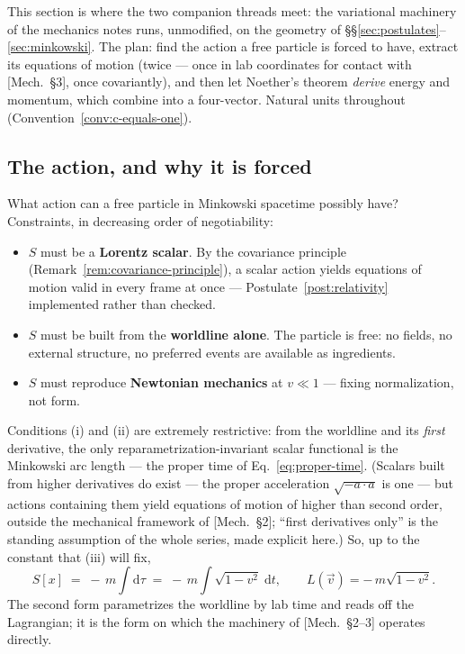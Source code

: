 \documentclass[11pt]{article}
\theoremstyle{plain}
\theoremstyle{definition}
\theoremstyle{remark}
\newcommand{\dd}{\mathrm{d}}
\newcommand{\vv}{\vec{v}}
\begin{document}
This section is where the two companion threads meet: the variational
machinery of the mechanics notes runs, unmodified, on the geometry of
\S\S\ref{sec:postulates}--\ref{sec:minkowski}. The plan: find the
action a free particle is forced to have, extract its equations of
motion (twice --- once in lab coordinates for contact with
[Mech.\ \S3], once covariantly), and then let Noether's theorem
\emph{derive} energy and momentum, which combine into a
four-vector. Natural units throughout
(Convention~\ref{conv:c-equals-one}).

\subsection{The action, and why it is forced}
\label{sec:particle-action}

What action can a free particle in Minkowski spacetime possibly have?
Constraints, in decreasing order of negotiability:
\begin{itemize}
  \item[(i)] $S$ must be a \textbf{Lorentz scalar}. By the covariance
  principle (Remark~\ref{rem:covariance-principle}), a scalar action
  yields equations of motion valid in every frame at once ---
  Postulate~\ref{post:relativity} implemented rather than checked.
  \item[(ii)] $S$ must be built from the \textbf{worldline alone}. The
  particle is free: no fields, no external structure, no preferred
  events are available as ingredients.
  \item[(iii)] $S$ must reproduce \textbf{Newtonian mechanics} at
  $v \ll 1$ --- fixing normalization, not form.
\end{itemize}
Conditions (i) and (ii) are extremely restrictive: from the worldline
and its \emph{first} derivative, the only reparametrization-invariant
scalar functional is the Minkowski arc length --- the
proper time of Eq.~\eqref{eq:proper-time}. (Scalars built from higher
derivatives do exist --- the proper acceleration $\sqrt{-a \cdot a}$
is one --- but actions containing them yield equations of motion of
higher than second order, outside the mechanical framework of
[Mech.\ \S2]; ``first derivatives only'' is the standing assumption
of the whole series, made explicit here.) So, up to the constant that
(iii) will fix,
\begin{equation}
  \boxed{\;
  S[x] \;=\; -\,m \int \dd\tau
  \;=\; -\,m \int \sqrt{1 - v^2}\;\dd t,
  \qquad
  L(\vv) = -\,m\sqrt{1 - v^2}.
  \;}
  \label{eq:particle-action}
\end{equation}
The second form parametrizes the worldline by lab time and reads off
the Lagrangian; it is the form on which the machinery of
[Mech.\ \S2--3] operates directly.
\end{document}
